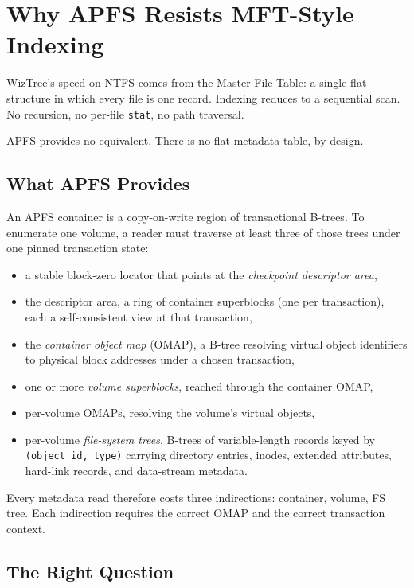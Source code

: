 \chapter{Why APFS Resists MFT-Style Indexing}

WizTree's speed on NTFS comes from the Master File Table: a single
flat structure in which every file is one record. Indexing reduces
to a sequential scan. No recursion, no per-file \texttt{stat}, no
path traversal.

APFS provides no equivalent. There is no flat metadata table, by
design.

\section{What APFS Provides}

An APFS container is a copy-on-write region of transactional
B-trees. To enumerate one volume, a reader must traverse at least
three of those trees under one pinned transaction state:

\begin{itemize}
  \item a stable block-zero locator that points at the
    \emph{checkpoint descriptor area},
  \item the descriptor area, a ring of container superblocks (one
    per transaction), each a self-consistent view at that
    transaction,
  \item the \emph{container object map} (OMAP), a B-tree resolving
    virtual object identifiers to physical block addresses under a
    chosen transaction,
  \item one or more \emph{volume superblocks}, reached through the
    container OMAP,
  \item per-volume OMAPs, resolving the volume's virtual objects,
  \item per-volume \emph{file-system trees}, B-trees of
    variable-length records keyed by \texttt{(object\_id, type)}
    carrying directory entries, inodes, extended attributes,
    hard-link records, and data-stream metadata.
\end{itemize}

Every metadata read therefore costs three indirections: container,
volume, FS tree. Each indirection requires the correct OMAP and
the correct transaction context.

\section{The Right Question}

